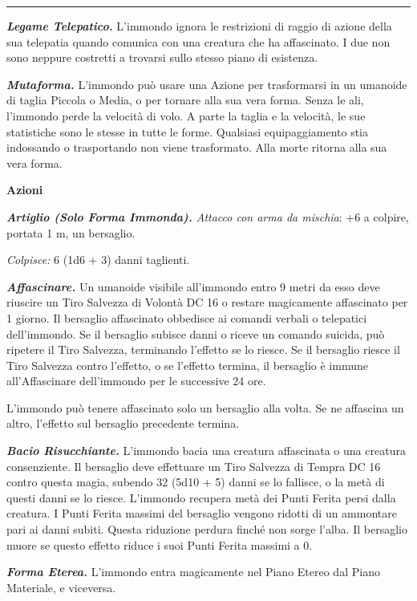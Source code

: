 \begin{multicols}{2}
{\noindent\rule{\linewidth}{2pt}

\medskip

\emph{\textbf{Legame Telepatico.}} L'immondo ignora le restrizioni di raggio di azione della sua telepatia quando comunica con una creatura che ha affascinato. I due non sono neppure costretti a trovarsi sullo stesso piano di esistenza.

\emph{\textbf{Mutaforma.}} L'immondo può usare una Azione per trasformarsi in un umanoide di taglia Piccola o Media, o per tornare alla sua vera forma. Senza le ali, l'immondo perde la velocità di volo. A parte la taglia e la velocità, le sue statistiche sono le stesse in tutte le forme. Qualsiasi equipaggiamento stia indossando o trasportando non viene trasformato. Alla morte ritorna alla sua vera forma.

\textbf{Azioni}

\emph{\textbf{Artiglio (Solo Forma Immonda).} Attacco con arma da mischia}: +6 a colpire, portata 1 m, un bersaglio.

\emph{Colpisce:} 6 (1d6 + 3) danni taglienti.

\emph{\textbf{Affascinare.}} Un umanoide visibile all'immondo entro 9 metri da esso deve riuscire un Tiro Salvezza di Volontà DC 16 o restare magicamente affascinato per 1 giorno. Il bersaglio affascinato obbedisce ai comandi verbali o telepatici dell'immondo. Se il bersaglio subisce danni o riceve un comando suicida, può ripetere il Tiro Salvezza, terminando l'effetto se lo riesce. Se il bersaglio riesce il Tiro Salvezza contro l'effetto, o se l'effetto termina, il bersaglio è immune all'Affascinare dell'immondo per le successive 24 ore.

L'immondo può tenere affascinato solo un bersaglio alla volta. Se ne affascina un altro, l'effetto sul bersaglio precedente termina.

\emph{\textbf{Bacio Risucchiante.}} L'immondo bacia una creatura affascinata o una creatura consenziente. Il bersaglio deve effettuare un Tiro Salvezza di Tempra DC 16 contro questa magia, subendo 32 (5d10 + 5) danni se lo fallisce, o la metà di questi danni se lo riesce. L'immondo recupera metà dei Punti Ferita persi dalla creatura. I Punti Ferita massimi del bersaglio vengono ridotti di un ammontare pari ai danni subiti. Questa riduzione perdura finché non sorge l'alba. Il bersaglio muore se questo effetto riduce i suoi Punti Ferita massimi a 0.

\emph{\textbf{Forma Eterea.}} L'immondo entra magicamente nel Piano Etereo dal Piano Materiale, e viceversa.

}
\end{multicols}
